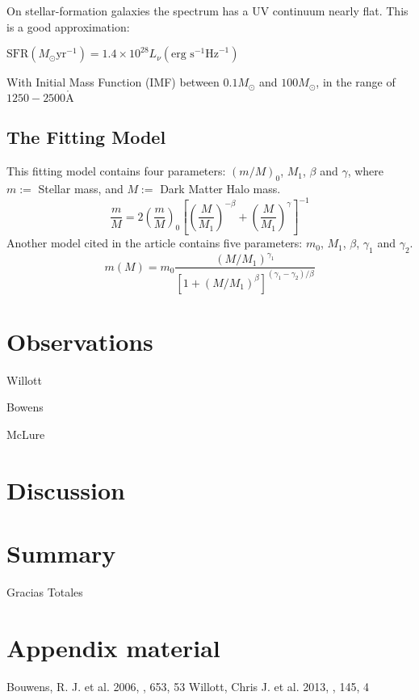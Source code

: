 \documentclass[manuscript]{aastex}
\begin{document}
On stellar-formation galaxies the spectrum has a UV continuum nearly flat. This is a good approximation:

$ \textrm{SFR}\left(M_\odot \textrm{yr}^{-1}\right) = 1.4 \times 10^{28} L_{\nu} \left( \textrm{erg s}^{-1}\textrm{Hz}^{-1} \right)$

With Initial Mass Function (IMF) between $0.1 M_\odot$ and $100 M_\odot$, in the range of $1250-2500 \mathring{\textrm{A}} $


\subsection{The Fitting Model}

This fitting model contains four parameters: $\left(m/M\right)_0$, $M_1$, $\beta$ and $\gamma$, 
where $m:=$ Stellar mass, and $M :=$ Dark Matter Halo mass.
\begin{equation}
\frac{m}{M} = 2 \left( \frac{m}{M} \right)_{0} 
		  \left[ \left(\frac{M}{M_1}\right)^{-\beta} + \left(\frac{M}{M_1}\right)^{\gamma} \right]^{-1} 
\end{equation}
Another model cited in the article contains five parameters: $m_0$, $M_1$, $\beta$, $\gamma_1$ and $\gamma_2$.
\[ m(M) = m_0 \frac{ (M/M_1)^{\gamma_1}}{ \left[ 1 + (M/M_1)^\beta \right]^{ (\gamma_1-\gamma_2)/\beta}} \]


\section{Observations}

Willott

Bowens

McLure


\section{Discussion}

\section{Summary}


\acknowledgments
Gracias Totales


\appendix

\section{Appendix material}


\begin{thebibliography}{}
 Bouwens, R. J. et al. 2006, \apj, 653, 53
 Willott, Chris J. et al. 2013, \aj, 145, 4
\end{thebibliography}
\end{document}
